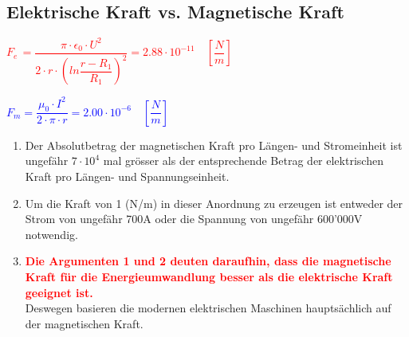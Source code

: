 \subsection{Elektrische Kraft vs. Magnetische Kraft}
\begin{minipage}{0.5\textwidth}
	\centering
\textcolor{red}{$F_e\, = \dfrac{\pi\cdot\epsilon_0\cdot U^2}{2\cdot r\cdot\left(ln\dfrac{r-R_1}{R_1}\right)^2} = 2.88\cdot 10^{-11} \quad \left[\dfrac{N}{m}\right]$}
\end{minipage}
\begin{minipage}{0.5\textwidth}
	\centering
\textcolor{blue}{$F_m = \dfrac{\mu_0\cdot I^2}{2\cdot\pi\cdot r} = 2.00 \cdot 10^{-6} \quad\left[\dfrac{N}{m}\right]$}
\end{minipage}
\begin{enumerate}
	\item Der Absolutbetrag der magnetischen Kraft pro Längen- und Stromeinheit ist
	ungefähr $7\cdot10^4$ mal grösser als der entsprechende Betrag der elektrischen Kraft
	pro Längen- und Spannungseinheit.
	\item Um die Kraft von 1 (N/m) in dieser Anordnung zu erzeugen ist entweder der
	Strom von ungefähr 700A oder die Spannung von ungefähr 600’000V notwendig.
	\item \textcolor{red}{\textbf{Die Argumenten 1 und 2 deuten daraufhin, dass die magnetische Kraft für die Energieumwandlung besser als die elektrische Kraft geeignet ist.}}\\[0.2cm]
	Deswegen basieren die modernen elektrischen Maschinen hauptsächlich auf der magnetischen Kraft.
\end{enumerate}
\newpage